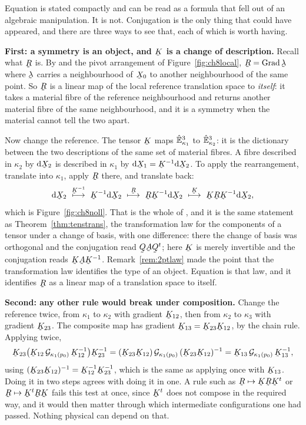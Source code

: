 Equation  is stated compactly and can be read as a formula
that fell out of an algebraic manipulation. It is not. Conjugation is
the only thing that could have appeared, and there are three ways to see
that, each of which is worth having.

\medskip
\noindent\textbf{First: a symmetry is an object, and $\bK$ is a change
of description.} Recall what $\bR$ is. By  and the pivot
arrangement of Figure~\ref{fig:ch8local}, $\bR=\Grad\vek{\lambda}$ where
$\vek{\lambda}$ carries a neighbourhood of $\bX_{0}$ to another
neighbourhood of the same point. So $\bR$ is a linear map of the local
reference translation space to \emph{itself}: it takes a material fibre
of the reference neighbourhood and returns another material fibre of the
same neighbourhood, and it is a symmetry when the material cannot tell
the two apart.

Now change the reference. The tensor $\bK$ maps $\hat{\mathbb{E}}^{3}_{\kappa_{1}}$ to
$\hat{\mathbb{E}}^{3}_{\kappa_{2}}$: it is the dictionary between the two descriptions
of the same set of material fibres. A fibre described in $\kappa_{2}$ by
$\dl\bX_{2}$ is described in $\kappa_{1}$ by
$\dl\bX_{1}=\bK^{-1}\dl\bX_{2}$. To apply the rearrangement, translate
into $\kappa_{1}$, apply $\bR$ there, and translate back:
\[
   \dl\bX_{2}\ \overset{\bK^{-1}}{\longmapsto}\ \bK^{-1}\dl\bX_{2}
   \ \overset{\bR}{\longmapsto}\ \bR\bK^{-1}\dl\bX_{2}
   \ \overset{\bK}{\longmapsto}\ \bK\bR\bK^{-1}\dl\bX_{2},
\]
which is Figure~\ref{fig:ch8noll}. That is the whole of , and
it is the same statement as Theorem~\ref{thm:tenstrans}, the
transformation law for the components of a tensor under a change of
basis, with one difference: there the change of basis was orthogonal and
the conjugation read $\bQ\bA\bQ^{t}$; here $\bK$ is merely invertible
and the conjugation reads $\bK\bA\bK^{-1}$. Remark~\ref{rem:2ptlaw} made
the point that the transformation law identifies the type of an object.
Equation  is that law, and it identifies $\bR$ as a linear map
of a translation space to itself.

\medskip
\noindent\textbf{Second: any other rule would break under composition.}
Change the reference twice, from $\kappa_{1}$ to $\kappa_{2}$ with
gradient $\bK_{12}$, then from $\kappa_{2}$ to $\kappa_{3}$ with
gradient $\bK_{23}$. The composite map has gradient
$\bK_{13}=\bK_{23}\bK_{12}$, by the chain rule. Applying 
twice,
\[
   \bK_{23}\big(\bK_{12}\,\mathcal{G}_{\kappa_{1}(p_{0})}\,
   \bK_{12}^{-1}\big)\bK_{23}^{-1}
   =(\bK_{23}\bK_{12})\,\mathcal{G}_{\kappa_{1}(p_{0})}\,
   (\bK_{23}\bK_{12})^{-1}
   =\bK_{13}\,\mathcal{G}_{\kappa_{1}(p_{0})}\,\bK_{13}^{-1},
\]
using $(\bK_{23}\bK_{12})^{-1}=\bK_{12}^{-1}\bK_{23}^{-1}$, which is the
same as applying  once with $\bK_{13}$. Doing it in two steps
agrees with doing it in one. A rule such as
$\bR\mapsto\bK\bR\bK^{t}$ or $\bR\mapsto\bK^{t}\bR\bK$ fails this test
at once, since $\bK^{t}$ does not compose in the required way, and it
would then matter through which intermediate configurations one had
passed. Nothing physical can depend on that.

